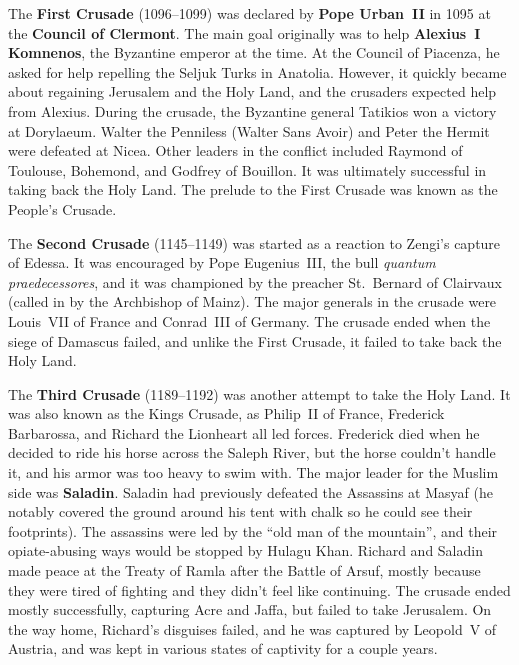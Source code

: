 The \textbf{First Crusade} (1096--1099) was declared by \textbf{Pope Urban~II} in 1095
at the \textbf{Council of Clermont}.
The main goal originally was to help \textbf{Alexius~I Komnenos}, the Byzantine emperor at the time.
At the Council of Piacenza, he asked for help repelling the Seljuk Turks in Anatolia.
However, it quickly became about regaining Jerusalem and the Holy Land,
and the crusaders expected help from Alexius.
During the crusade, the Byzantine general Tatikios won a victory at Dorylaeum.
Walter the Penniless (Walter Sans Avoir) and Peter the Hermit were defeated at Nicea.
Other leaders in the conflict included Raymond of Toulouse, Bohemond, and Godfrey of Bouillon.
It was ultimately successful in taking back the Holy Land.
The prelude to the First Crusade was known as the People's Crusade.

The \textbf{Second Crusade} (1145--1149) was started as a reaction to Zengi's capture of Edessa.
It was encouraged by Pope Eugenius~III\@, the bull \textit{quantum praedecessores},
and it was championed by the preacher St.\ Bernard of Clairvaux (called in by the Archbishop of Mainz).
The major generals in the crusade were Louis~VII of France and Conrad~III of Germany.
The crusade ended when the siege of Damascus failed, and unlike the First Crusade,
it failed to take back the Holy Land.

The \textbf{Third Crusade} (1189--1192) was another attempt to take the Holy Land.
It was also known as the Kings Crusade,
as Philip~II of France, Frederick Barbarossa, and Richard the Lionheart all led forces.
Frederick died when he decided to ride his horse across the Saleph River,
but the horse couldn't handle it, and his armor was too heavy to swim with.
The major leader for the Muslim side was \textbf{Saladin}.
Saladin had previously defeated the Assassins at Masyaf
(he notably covered the ground around his tent with chalk so he could see their footprints).
The assassins were led by the ``old man of the mountain'',
and their opiate-abusing ways would be stopped by Hulagu Khan.
Richard and Saladin made peace at the Treaty of Ramla after the Battle of Arsuf,
mostly because they were tired of fighting and they didn't feel like continuing.
The crusade ended mostly successfully, capturing Acre and Jaffa, but failed to take Jerusalem.
On the way home, Richard's disguises failed, and he was captured by Leopold~V of Austria,
and was kept in various states of captivity for a couple years.

